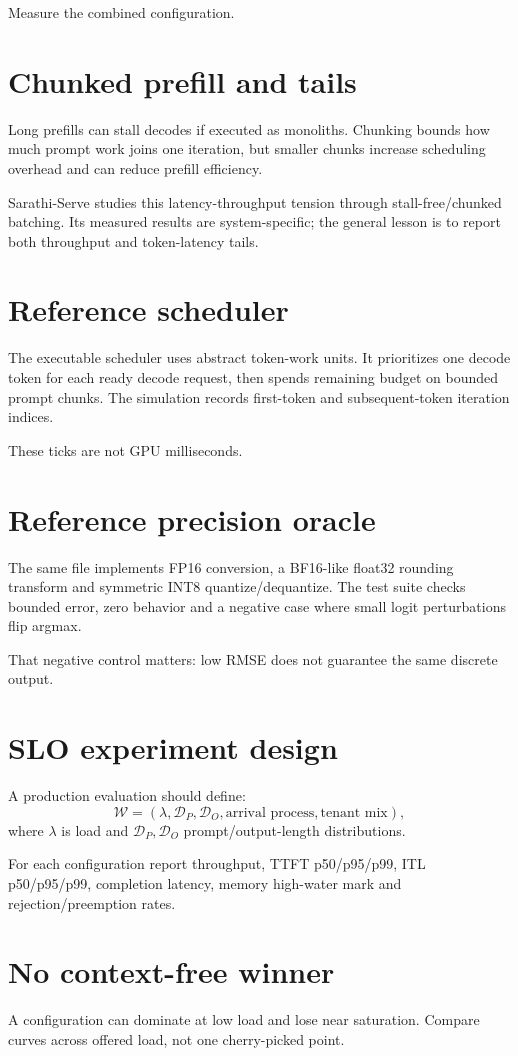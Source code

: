 Measure the combined configuration.

\section{Chunked prefill and tails}
Long prefills can stall decodes if executed as monoliths. Chunking bounds how much prompt work joins one iteration, but smaller chunks increase scheduling overhead and can reduce prefill efficiency.

Sarathi-Serve studies this latency-throughput tension through stall-free/chunked batching. Its measured results are system-specific; the general lesson is to report both throughput and token-latency tails.

\section{Reference scheduler}
The executable scheduler uses abstract token-work units. It prioritizes one decode token for each ready decode request, then spends remaining budget on bounded prompt chunks. The simulation records first-token and subsequent-token iteration indices.

These ticks are not GPU milliseconds.

\section{Reference precision oracle}
The same file implements FP16 conversion, a BF16-like float32 rounding transform and symmetric INT8 quantize/dequantize. The test suite checks bounded error, zero behavior and a negative case where small logit perturbations flip argmax.

That negative control matters: low RMSE does not guarantee the same discrete output.

\section{SLO experiment design}
A production evaluation should define:
\[
\mathcal W=(\lambda,\mathcal D_P,\mathcal D_O,\text{arrival process},\text{tenant mix}),
\]
where $\lambda$ is load and $\mathcal D_P,\mathcal D_O$ prompt/output-length distributions.

For each configuration report throughput, TTFT p50/p95/p99, ITL p50/p95/p99, completion latency, memory high-water mark and rejection/preemption rates.

\section{No context-free winner}
A configuration can dominate at low load and lose near saturation. Compare curves across offered load, not one cherry-picked point.

